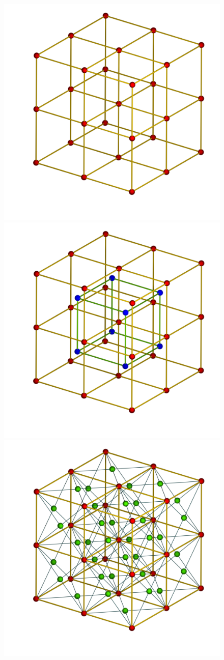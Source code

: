 \begin{figure}
  \centering
  \mbox{} \hfill
	\includegraphics[width=.3\linewidth]{figures/lattice/cc}
	\includegraphics[width=.3\linewidth]{figures/lattice/bcc}
	\includegraphics[width=.3\linewidth]{figures/lattice/fcc} \\
	

\end{figure}

